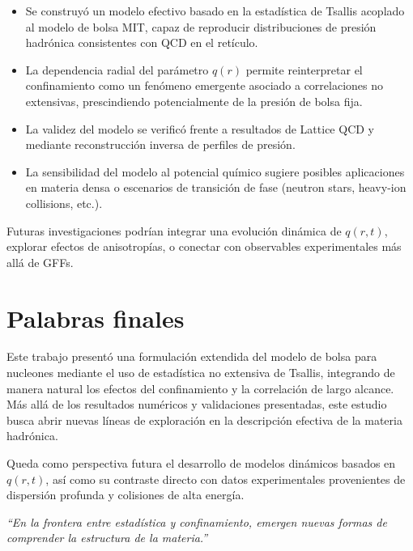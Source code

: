 \begin{itemize}
    \item Se construyó un modelo efectivo basado en la estadística de Tsallis acoplado al modelo de bolsa MIT, capaz de reproducir distribuciones de presión hadrónica consistentes con QCD en el retículo.
    \item La dependencia radial del parámetro \( q(r) \) permite reinterpretar el confinamiento como un fenómeno emergente asociado a correlaciones no extensivas, prescindiendo potencialmente de la presión de bolsa fija.
    \item La validez del modelo se verificó frente a resultados de Lattice QCD y mediante reconstrucción inversa de perfiles de presión.
    \item La sensibilidad del modelo al potencial químico sugiere posibles aplicaciones en materia densa o escenarios de transición de fase (neutron stars, heavy-ion collisions, etc.).
\end{itemize}

\begin{remark}[Perspectivas]
    Futuras investigaciones podrían integrar una evolución dinámica de \( q(r,t) \), explorar efectos de anisotropías, o conectar con observables experimentales más allá de GFFs.
\end{remark}

\section*{Palabras finales}

Este trabajo presentó una formulación extendida del modelo de bolsa para nucleones mediante el uso de estadística no extensiva de Tsallis, integrando de manera natural los efectos del confinamiento y la correlación de largo alcance. Más allá de los resultados numéricos y validaciones presentadas, este estudio busca abrir nuevas líneas de exploración en la descripción efectiva de la materia hadrónica. 

Queda como perspectiva futura el desarrollo de modelos dinámicos basados en \( q(r,t) \), así como su contraste directo con datos experimentales provenientes de dispersión profunda y colisiones de alta energía.

\vspace{1em}
\noindent
\textit{“En la frontera entre estadística y confinamiento, emergen nuevas formas de comprender la estructura de la materia.”}